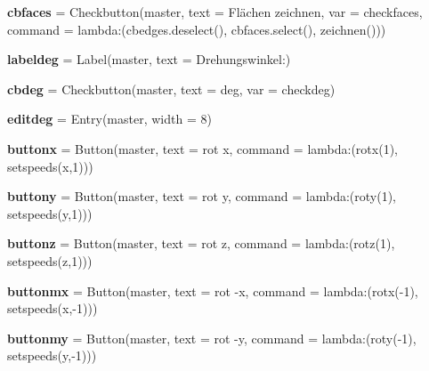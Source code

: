 \begin{DoxyCompactItemize}
{\bfseries cbfaces} = Checkbutton(master, text = \textquotesingle{}Flächen zeichnen\textquotesingle{}, var = checkfaces, command = lambda\+:(cbedges.\+deselect(), cbfaces.\+select(), zeichnen()))
\item 
\mbox{\label{namespacelatest_ac5801a4556e3892f6aa7f6b121f58964}} 
{\bfseries labeldeg} = Label(master, text = \textquotesingle{}Drehungswinkel\+:\textquotesingle{})
\item 
\mbox{\label{namespacelatest_a8c851ee5e2f129e9e86ce4465c921017}} 
{\bfseries cbdeg} = Checkbutton(master, text = \textquotesingle{}deg\textquotesingle{}, var = checkdeg)
\item 
\mbox{\label{namespacelatest_ac9fb01ba8cdf25beb1bd153cc35177b3}} 
{\bfseries editdeg} = Entry(master, width = 8)
\item 
\mbox{\label{namespacelatest_a77a4cbc96c02f02bceb0f5e49168cd52}} 
{\bfseries buttonx} = Button(master, text = \textquotesingle{}rot x\textquotesingle{}, command = lambda\+:(rotx(1), setspeeds(\textquotesingle{}x\textquotesingle{},1)))
\item 
\mbox{\label{namespacelatest_ab4512882fca7de1fcd867c6acc0700bd}} 
{\bfseries buttony} = Button(master, text = \textquotesingle{}rot y\textquotesingle{}, command = lambda\+:(roty(1), setspeeds(\textquotesingle{}y\textquotesingle{},1)))
\item 
\mbox{\label{namespacelatest_a5e2ac91c3def0deea445505d79ca654e}} 
{\bfseries buttonz} = Button(master, text = \textquotesingle{}rot z\textquotesingle{}, command = lambda\+:(rotz(1), setspeeds(\textquotesingle{}z\textquotesingle{},1)))
\item 
\mbox{\label{namespacelatest_a2d90602ada1420f26f3cce9300734462}} 
{\bfseries buttonmx} = Button(master, text = \textquotesingle{}rot -\/x\textquotesingle{}, command = lambda\+:(rotx(-\/1), setspeeds(\textquotesingle{}x\textquotesingle{},-\/1)))
\item 
\mbox{\label{namespacelatest_a5e4c1536a44e9a828410e2082e3299b1}} 
{\bfseries buttonmy} = Button(master, text = \textquotesingle{}rot -\/y\textquotesingle{}, command = lambda\+:(roty(-\/1), setspeeds(\textquotesingle{}y\textquotesingle{},-\/1)))

\end{DoxyCompactItemize}
